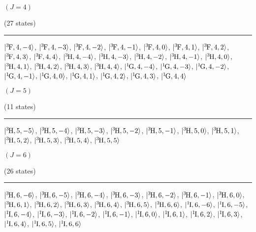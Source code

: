 \begin{mdframed}
\begin{center}
$(J=4)$

(27 states)
\vspace{0.25cm}
\hrule
\vspace{0.25cm}
$\ket{\LSterm{3}{F},4,-4}$, $\ket{\LSterm{3}{F},4,-3}$, $\ket{\LSterm{3}{F},4,-2}$, $\ket{\LSterm{3}{F},4,-1}$, $\ket{\LSterm{3}{F},4,0}$, $\ket{\LSterm{3}{F},4,1}$, $\ket{\LSterm{3}{F},4,2}$, $\ket{\LSterm{3}{F},4,3}$, $\ket{\LSterm{3}{F},4,4}$, $\ket{\LSterm{3}{H},4,-4}$, $\ket{\LSterm{3}{H},4,-3}$, $\ket{\LSterm{3}{H},4,-2}$, $\ket{\LSterm{3}{H},4,-1}$, $\ket{\LSterm{3}{H},4,0}$, $\ket{\LSterm{3}{H},4,1}$, $\ket{\LSterm{3}{H},4,2}$, $\ket{\LSterm{3}{H},4,3}$, $\ket{\LSterm{3}{H},4,4}$, $\ket{\LSterm{1}{G},4,-4}$, $\ket{\LSterm{1}{G},4,-3}$, $\ket{\LSterm{1}{G},4,-2}$, $\ket{\LSterm{1}{G},4,-1}$, $\ket{\LSterm{1}{G},4,0}$, $\ket{\LSterm{1}{G},4,1}$, $\ket{\LSterm{1}{G},4,2}$, $\ket{\LSterm{1}{G},4,3}$, $\ket{\LSterm{1}{G},4,4}$
\end{center}
\end{mdframed}

\begin{mdframed}
\begin{center}
$(J=5)$

(11 states)
\vspace{0.25cm}
\hrule
\vspace{0.25cm}
$\ket{\LSterm{3}{H},5,-5}$, $\ket{\LSterm{3}{H},5,-4}$, $\ket{\LSterm{3}{H},5,-3}$, $\ket{\LSterm{3}{H},5,-2}$, $\ket{\LSterm{3}{H},5,-1}$, $\ket{\LSterm{3}{H},5,0}$, $\ket{\LSterm{3}{H},5,1}$, $\ket{\LSterm{3}{H},5,2}$, $\ket{\LSterm{3}{H},5,3}$, $\ket{\LSterm{3}{H},5,4}$, $\ket{\LSterm{3}{H},5,5}$
\end{center}
\end{mdframed}

\begin{mdframed}
\begin{center}
$(J=6)$

(26 states)
\vspace{0.25cm}
\hrule
\vspace{0.25cm}
$\ket{\LSterm{3}{H},6,-6}$, $\ket{\LSterm{3}{H},6,-5}$, $\ket{\LSterm{3}{H},6,-4}$, $\ket{\LSterm{3}{H},6,-3}$, $\ket{\LSterm{3}{H},6,-2}$, $\ket{\LSterm{3}{H},6,-1}$, $\ket{\LSterm{3}{H},6,0}$, $\ket{\LSterm{3}{H},6,1}$, $\ket{\LSterm{3}{H},6,2}$, $\ket{\LSterm{3}{H},6,3}$, $\ket{\LSterm{3}{H},6,4}$, $\ket{\LSterm{3}{H},6,5}$, $\ket{\LSterm{3}{H},6,6}$, $\ket{\LSterm{1}{I},6,-6}$, $\ket{\LSterm{1}{I},6,-5}$, $\ket{\LSterm{1}{I},6,-4}$, $\ket{\LSterm{1}{I},6,-3}$, $\ket{\LSterm{1}{I},6,-2}$, $\ket{\LSterm{1}{I},6,-1}$, $\ket{\LSterm{1}{I},6,0}$, $\ket{\LSterm{1}{I},6,1}$, $\ket{\LSterm{1}{I},6,2}$, $\ket{\LSterm{1}{I},6,3}$, $\ket{\LSterm{1}{I},6,4}$, $\ket{\LSterm{1}{I},6,5}$, $\ket{\LSterm{1}{I},6,6}$
\end{center}
\end{mdframed}